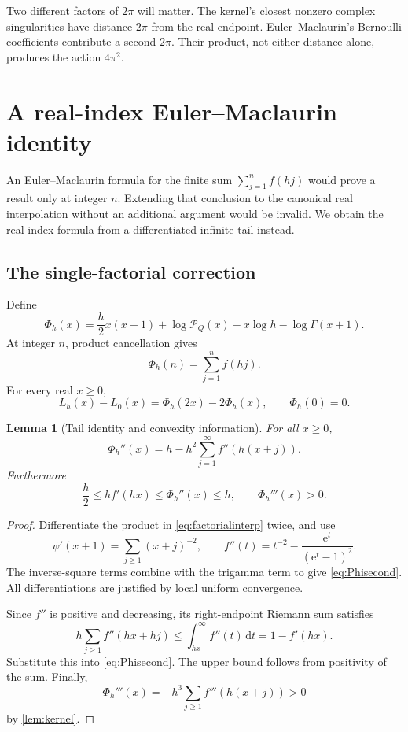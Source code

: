 \documentclass[11pt,a4paper]{article}
\numberwithin{equation}{section}
\newtheorem{lemma}[theorem]{Lemma}
\theoremstyle{definition}
\newcommand{\ee}{\mathrm e}
\newcommand{\dd}{\,\mathrm d}
\newcommand{\Pq}{\mathcal P}
\begin{document}
Two different factors of $2\pi$ will matter. The kernel's closest nonzero complex singularities have distance $2\pi$ from the real endpoint. Euler--Maclaurin's Bernoulli coefficients contribute a second $2\pi$. Their product, not either distance alone, produces the action $4\pi^2$.

\section{A real-index Euler--Maclaurin identity}
\label{sec:EM}

An Euler--Maclaurin formula for the finite sum $\sum_{j=1}^n f(hj)$ would prove a result only at integer $n$. Extending that conclusion to the canonical real interpolation without an additional argument would be invalid. We obtain the real-index formula from a differentiated infinite tail instead.

\subsection{The single-factorial correction}
Define
\begin{equation}
\Phi_h(x)=\frac h2 x(x+1)+\log\Pq_Q(x)
                         -x\log h-\log\Gamma(x+1).
\label{eq:Phi}
\end{equation}
At integer $n$, product cancellation gives
\[
\Phi_h(n)=\sum_{j=1}^n f(hj).
\]
For every real $x\ge0$,
\begin{equation}
L_h(x)-L_0(x)=\Phi_h(2x)-2\Phi_h(x),\qquad \Phi_h(0)=0.
\label{eq:Phicentral}
\end{equation}

\begin{lemma}[Tail identity and convexity information]
\label{lem:Phi}
For all $x\ge0$,
\begin{equation}
\Phi_h''(x)=h-h^2\sum_{j=1}^{\infty}f''(h(x+j)).
\label{eq:Phisecond}
\end{equation}
Furthermore
\begin{equation}
\frac h2\le h f'(hx)\le\Phi_h''(x)\le h,
\qquad \Phi_h'''(x)>0.
\label{eq:Phibounds}
\end{equation}
\end{lemma}
\begin{proof}
Differentiate the product in \eqref{eq:factorialinterp} twice, and use
\[
\psi'(x+1)=\sum_{j\ge1}(x+j)^{-2},\qquad
f''(t)=t^{-2}-\frac{\ee^t}{(\ee^t-1)^2}.
\]
The inverse-square terms combine with the trigamma term to give \eqref{eq:Phisecond}. All differentiations are justified by local uniform convergence.

Since $f''$ is positive and decreasing, its right-endpoint Riemann sum satisfies
\[
h\sum_{j\ge1}f''(hx+hj)
 \le\int_{hx}^{\infty}f''(t)\dd t=1-f'(hx).
\]
Substitute this into \eqref{eq:Phisecond}. The upper bound follows from positivity of the sum. Finally,
\[
\Phi_h'''(x)=-h^3\sum_{j\ge1}f'''(h(x+j))>0
\]
by \cref{lem:kernel}.
\end{proof}
\end{document}
